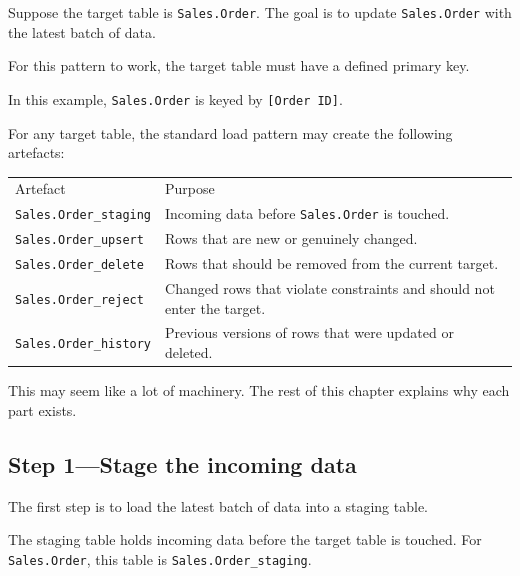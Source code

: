 \documentclass[10pt,openany,10pt]{book}
\newcounter{none}
\let\podeToprule\toprule
\let\podeMidrule\midrule
\let\podeBottomrule\bottomrule
\renewcommand{\toprule}{\arrayrulecolor{pbiGrid}\podeToprule}
\renewcommand{\midrule}{\arrayrulecolor{pbiGrid}\podeMidrule}
\renewcommand{\bottomrule}{\arrayrulecolor{pbiGrid}\podeBottomrule}
\begin{document}
Suppose the target table is \texttt{Sales.Order}. The goal is to update
\texttt{Sales.Order} with the latest batch of data.

For this pattern to work, the target table must have a defined primary
key.

In this example, \texttt{Sales.Order} is keyed by
\texttt{{[}Order\ ID{]}}.

For any target table, the standard load pattern may create the following
artefacts:

{\def\LTcaptype{none} %
\begin{longtable}[]{@{}
  >{\raggedright\arraybackslash}p{}
  >{\raggedright\arraybackslash}p{}@{}}
\toprule\noalign{}
\begin{minipage}[b]{\linewidth}\raggedright
Artefact
\end{minipage} & \begin{minipage}[b]{\linewidth}\raggedright
Purpose
\end{minipage} \\
\midrule\noalign{}
\endhead
\bottomrule\noalign{}
\endlastfoot
\texttt{Sales.Order\_staging} & Incoming data before
\texttt{Sales.Order} is touched. \\
\texttt{Sales.Order\_upsert} & Rows that are new or genuinely
changed. \\
\texttt{Sales.Order\_delete} & Rows that should be removed from the
current target. \\
\texttt{Sales.Order\_reject} & Changed rows that violate constraints and
should not enter the target. \\
\texttt{Sales.Order\_history} & Previous versions of rows that were
updated or deleted. \\
\end{longtable}
}

This may seem like a lot of machinery. The rest of this chapter explains
why each part exists.

\subsection{Step 1---Stage the incoming
data}\label{step-1stage-the-incoming-data}

The first step is to load the latest batch of data into a staging table.

The staging table holds incoming data before the target table is
touched. For \texttt{Sales.Order}, this table is
\texttt{Sales.Order\_staging}.
\end{document}
